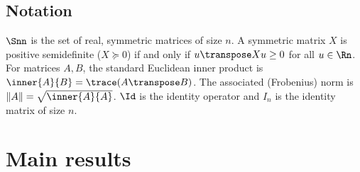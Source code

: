 \documentclass{article}
\newcommand{\1}{\mathbf{1}}
\begin{document}



\subsection*{Notation}

$\Snn$ is the set of real, symmetric matrices of size $n$. A symmetric matrix $X$ is positive semidefinite ($X \succeq 0$) if and only if $u\transpose X u \geq 0$ for all $u\in\Rn$. For matrices $A, B$, the standard Euclidean inner product is $\inner{A}{B} = \trace(A\transpose B)$. The associated (Frobenius) norm is $\|A\| = \sqrt{\inner{A}{A}}$. $\Id$ is the identity operator and $I_n$ is the identity matrix of size $n$.

\section{Main results}
\end{document}
